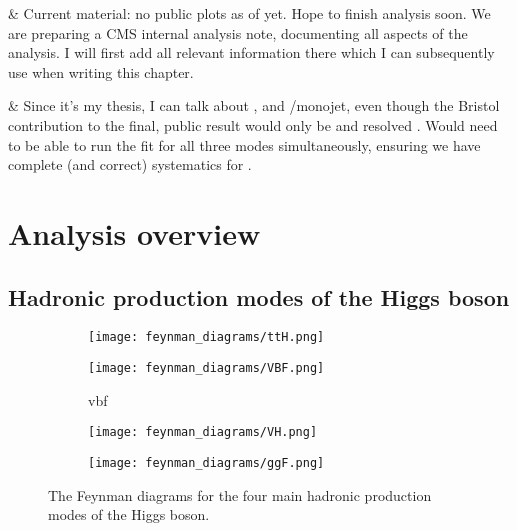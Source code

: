 \begin{easylist}[itemize]
    & Current material: no public plots as of yet. Hope to finish analysis soon. We are preparing a CMS internal analysis note, documenting all aspects of the analysis. I will first add all relevant information there which I can subsequently use when writing this chapter.

    & Since it's my thesis, I can talk about \ttH, \VH and \ggF/monojet, even though the Bristol contribution to the final, public result would only be \ttH and resolved \VH. Would need to be able to run the fit for all three modes simultaneously, ensuring we have complete (and correct) systematics for \ggF.
\end{easylist}






\section{Analysis overview}
\label{sec:htoinv_overview}




\subsection{Hadronic production modes of the Higgs boson}
\label{subsec:htoinv_production_modes}

\begin{figure}[htbp]
    \centering
    \begin{subfigure}[b]{0.45\textwidth}
        \texttt{[image: feynman\_diagrams/ttH.png]}
        \caption{\ttH}
    \end{subfigure}
    \hfill
    \begin{subfigure}[b]{0.45\textwidth}
        \texttt{[image: feynman\_diagrams/VBF.png]}
        \caption{\acrshort{vbf}}
    \end{subfigure}
    \begin{subfigure}[b]{0.45\textwidth}
        \texttt{[image: feynman\_diagrams/VH.png]}
        \caption{\VH}
    \end{subfigure}
    \hfill
    \begin{subfigure}[b]{0.45\textwidth}
        \texttt{[image: feynman\_diagrams/ggF.png]}
        \caption{\ggF}
    \end{subfigure}
\caption[The Feynman diagrams for the four main hadronic production modes of the Higgs boson]{The Feynman diagrams for the four main hadronic production modes of the Higgs boson.}
\label{fig:higgs_feynman_diagrams}
\end{figure}


